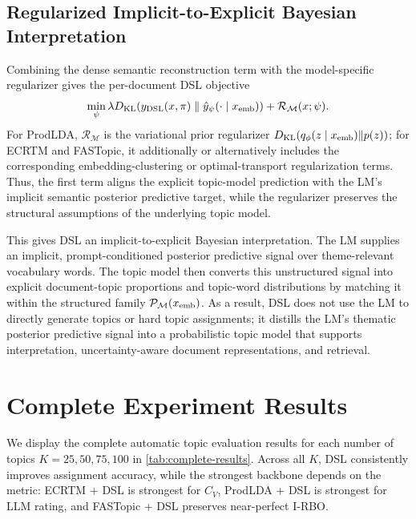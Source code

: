 \documentclass{article}
\newcommand{\best}[1]{\cellcolor{bestblue}\textbf{#1}}
\newcommand{\metric}[1]{\makecell[c]{\scriptsize #1}}
\newcommand{\model}[1]{\texttt{#1}}
\newcommand{\dataset}[1]{\multicolumn{4}{c}{\scriptsize\textbf{#1}}}
\newcommand{\sectionrow}[1]{%
  \addlinespace[0.35em]
  \rowcolor{sectiongray}
  \multicolumn{13}{c}{\scriptsize\textbf{#1}}\\
  \addlinespace[0.15em]
}
\providecommand{\best}[1]{#1}
\renewcommand{\best}[1]{%
  \begingroup
  \setlength{\fboxsep}{1.1pt}%
  \sbox{\dslbestbox}{\textbf{#1}}%
  \makebox[\wd\dslbestbox][c]{%
    \rlap{\smash{\kern-\fboxsep\colorbox{bestblue}{\phantom{\usebox{\dslbestbox}}}}}%
    \usebox{\dslbestbox}%
  }%
  \endgroup
}
\theoremstyle{plain}
\theoremstyle{definition}
\theoremstyle{remark}
\begin{document}
\subsection{Regularized Implicit-to-Explicit Bayesian Interpretation}

Combining the dense semantic reconstruction term with the model-specific regularizer gives the per-document DSL objective
\begin{equation}
\min_{\psi}
\lambda
D_{\mathrm{KL}}\!\left(
y_{\rm DSL}(x,\pi)
\;\middle\|\;
\hat{y}_{\psi}(\cdot\mid x_{\rm emb})
\right)
+
\mathcal{R}_{\mathcal{M}}(x;\psi).
\label{eq:app-regularized-dsl}
\end{equation}
For ProdLDA, $\mathcal{R}_{\mathcal{M}}$ is the variational prior regularizer $D_{\mathrm{KL}}(q_{\phi}(z\mid x_{\rm emb})\|p(z))$; for ECRTM and FASTopic, it additionally or alternatively includes the corresponding embedding-clustering or optimal-transport regularization terms. Thus, the first term aligns the explicit topic-model prediction with the LM's implicit semantic posterior predictive target, while the regularizer preserves the structural assumptions of the underlying topic model.

This gives DSL an implicit-to-explicit Bayesian interpretation. The LM supplies an implicit, prompt-conditioned posterior predictive signal over theme-relevant vocabulary words. The topic model then converts this unstructured signal into explicit document-topic proportions and topic-word distributions by matching it within the structured family $\mathcal{P}_{\mathcal{M}}(x_{\rm emb})$. As a result, DSL does not use the LM to directly generate topics or hard topic assignments; it distills the LM's thematic posterior predictive signal into a probabilistic topic model that supports interpretation, uncertainty-aware document representations, and retrieval.


\section{Complete Experiment Results}
\label{sec:complete-results}

We display the complete automatic topic evaluation results for each number of topics $K=25,50,75,100$ in \autoref{tab:complete-results}. Across all $K$, DSL consistently improves assignment accuracy, while the strongest backbone depends on the metric: ECRTM + DSL is strongest for $C_V$, ProdLDA + DSL is strongest for LLM rating, and FASTopic + DSL preserves near-perfect I-RBO.
\end{document}
